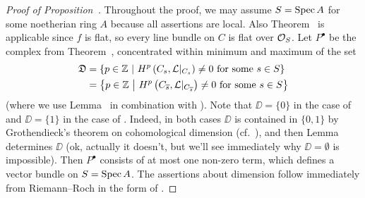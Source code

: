 \documentclass[a4paper,parskip=half,numbers=enddot, DIV=12]{scrreprt}
\begin{document}
\begin{proof}[Proof of Proposition~]
	Throughout the proof, we may assume $S=\operatorname{Spec} A$ for some noetherian ring $A$ because all assertions are local. Also Theorem~ is applicable since $f$ is flat, so every line bundle on $C$ is flat over $\mathcal{O}_S$. Let $P^\bullet$ be the complex from Theorem~, concentrated within minimum and maximum of the set
	\begin{align*}
		\mathfrak{D}&=\left\{p\in\mathbb{Z}\ \middle|\  H^p\left(C_s,\mathcal{L}|_{C_s}\right)\neq 0\text{ for some }s\in S\right\}\\
		&=\left\{p\in\mathbb{Z}\ \middle|\  H^p\left(C_{\overline{s}},\mathcal{L}|_{C_{\overline{s}}}\right)\neq 0\text{ for some }s\in S\right\}
	\end{align*}
	(where we use Lemma~ in combination with ). Note that $\DD=\{0\}$ in the case of  and $\DD=\{1\}$ in the case of . Indeed, in both cases $\DD$ is contained in $\{0,1\}$ by Grothendieck's theorem on cohomological dimension (cf.\ \cite[Proposition~1.4.1]{alggeo2}), and then Lemma~ determines $\DD$ (ok, actually it doesn't, but we'll see immediately why $\DD=\emptyset$ is impossible). Then $P^\bullet$ consists of at most one non-zero term, which defines a vector bundle on $S=\operatorname{Spec} A$. The assertions about dimension follow immediately from Riemann--Roch in the form of \cite[equation~(3.1.3)]{alggeo2}.
	

\end{proof}
\end{document}
